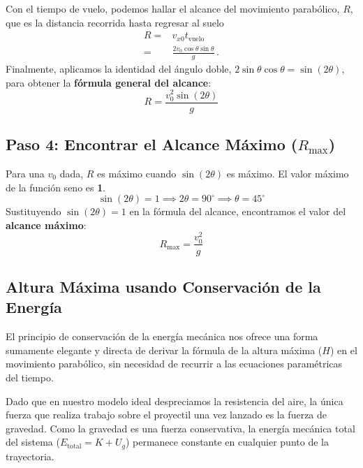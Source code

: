 \documentclass[11pt,a4paper]{book}
\begin{document}
Con el tiempo de vuelo, podemos hallar el alcance del movimiento parabólico, $R$, que es la distancia recorrida hasta regresar al suelo
\begin{align*}
    R=&v_{x0}t_{\text{vuelo}}\\
    =&\frac{2v_0\cos\theta\sin\theta}{g}\,.
\end{align*}
Finalmente, aplicamos la identidad del ángulo doble, $2\sin\theta\cos\theta = \sin(2\theta)$, para obtener la \textbf{fórmula general del alcance}:
\begin{equation}
    \boxed{R = \frac{v_0^2 \sin(2\theta)}{g}}
\end{equation}

\subsection*{Paso 4: Encontrar el Alcance Máximo ($R_{\text{max}}$)}
Para una $v_0$ dada, $R$ es máximo cuando $\sin(2\theta)$ es máximo. El valor máximo de la función seno es \textbf{1}.
\[ \sin(2\theta) = 1 \implies 2\theta = 90^\circ \implies \boxed{\theta = 45^\circ} \]
Sustituyendo $\sin(2\theta)=1$ en la fórmula del alcance, encontramos el valor del \textbf{alcance máximo}:
\begin{equation}
    \boxed{R_{\text{max}} = \frac{v_0^2}{g}}
\end{equation}

\subsection{Altura Máxima usando Conservación de la Energía}

El principio de conservación de la energía mecánica nos ofrece una forma sumamente elegante y directa de derivar la fórmula de la altura máxima ($H$) en el movimiento parabólico, sin necesidad de recurrir a las ecuaciones paramétricas del tiempo.

Dado que en nuestro modelo ideal despreciamos la resistencia del aire, la única fuerza que realiza trabajo sobre el proyectil una vez lanzado es la fuerza de gravedad. Como la gravedad es una fuerza conservativa, la energía mecánica total del sistema ($E_{\text{total}} = K + U_g$) permanece constante en cualquier punto de la trayectoria.
\end{document}
